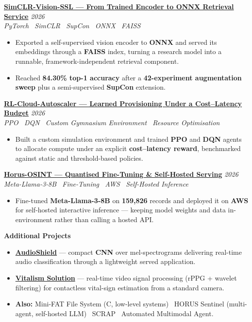 \documentclass[10pt, a4paper]{article}
\newcommand{\cvproject}[3]{%
  \vspace{2.5pt}%
  {\bfseries\color{navy}#1} \hfill {\color{midgray}\textit{#3}}\\[-1.5pt]%
  {\color{teal}\textit{#2}}%
}
\newcommand{\cvmini}[2]{\item {\bfseries\color{navy}#1} --- #2}
\newenvironment{cvitems}{%
  \begin{itemize}[leftmargin=11pt, itemsep=0.5pt, parsep=0pt, topsep=1pt,
                  label={\textcolor{teal}{$\bullet$}}]
}{%
  \end{itemize}%
}
\begin{document}
\cvproject{\href{https://github.com/MahmoudAlyosify/SimCLR-Vision-SSL}{SimCLR-Vision-SSL --- From Trained Encoder to ONNX Retrieval Service}}
          {PyTorch \textperiodcentered\ SimCLR \textperiodcentered\ SupCon \textperiodcentered\ ONNX \textperiodcentered\ FAISS}
          {2026}
\begin{cvitems}
  \item Exported a self-supervised vision encoder to \textbf{ONNX} and served its embeddings through a \textbf{FAISS} index, turning a research model into a runnable, framework-independent retrieval component.
  \item Reached \textbf{84.30\% top-1 accuracy} after a \textbf{42-experiment augmentation sweep} plus a semi-supervised \textbf{SupCon} extension.
\end{cvitems}

\cvproject{\href{https://github.com/MahmoudAlyosify/RL-Cloud-Autoscaler}{RL-Cloud-Autoscaler --- Learned Provisioning Under a Cost--Latency Budget}}
          {PPO \textperiodcentered\ DQN \textperiodcentered\ Custom Gymnasium Environment \textperiodcentered\ Resource Optimisation}
          {2026}
\begin{cvitems}
  \item Built a custom simulation environment and trained \textbf{PPO} and \textbf{DQN} agents to allocate compute under an explicit \textbf{cost--latency reward}, benchmarked against static and threshold-based policies.
\end{cvitems}

\cvproject{\href{https://github.com/MahmoudAlyosify/Horus-OSINT}{Horus-OSINT --- Quantised Fine-Tuning \& Self-Hosted Serving}}
          {Meta-Llama-3-8B \textperiodcentered\ Fine-Tuning \textperiodcentered\ AWS \textperiodcentered\ Self-Hosted Inference}
          {2026}
\begin{cvitems}
  \item Fine-tuned \textbf{Meta-Llama-3-8B} on \textbf{159,826} records and deployed it on \textbf{AWS} for self-hosted interactive inference --- keeping model weights and data in-environment rather than calling a hosted API.
\end{cvitems}

\vspace{3pt}
{\bfseries\color{navy}Additional Projects}
\begin{cvitems}
  \cvmini{\href{https://github.com/MahmoudAlyosify/AudioShield}{AudioShield}}{compact \textbf{CNN} over mel-spectrograms delivering real-time audio classification through a lightweight served application.}
  \cvmini{\href{https://vitalismsolution.github.io/}{Vitalism Solution}}{real-time video signal processing (rPPG + wavelet filtering) for contactless vital-sign estimation from a standard camera.}
  \item \textbf{Also:} Mini-FAT File System (C, low-level systems) \textperiodcentered\ HORUS Sentinel (multi-agent, self-hosted LLM) \textperiodcentered\ SCRAP \textperiodcentered\ Automated Multimodal Agent.
\end{cvitems}
\end{document}
